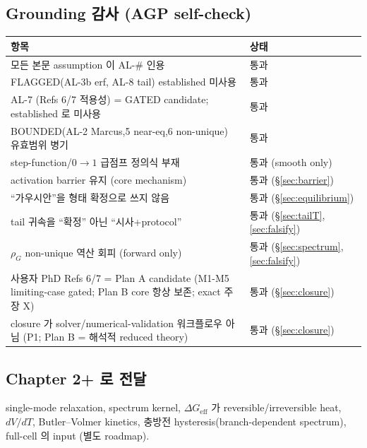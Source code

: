 \documentclass[11pt,a4paper]{article}
\newcommand{\eff}{\mathrm{eff}}
\begin{document}
\subsection{Grounding 감사 (AGP self-check)}
\begin{longtable}{p{} p{}}
\toprule 항목 & 상태 \\ \midrule \endhead
모든 본문 assumption 이 AL-\# 인용 & 통과 \\
FLAGGED(AL-3b erf, AL-8 tail) established 미사용 & 통과 \\
AL-7 (Refs 6/7 적용성) = GATED candidate; established 로 미사용 & 통과 \\
BOUNDED(AL-2 Marcus,5 near-eq,6 non-unique) 유효범위 병기 & 통과 \\
step-function/$0\!\to\!1$ 급점프 정의식 부재 & 통과 (smooth only) \\
activation barrier 유지 (core mechanism) & 통과 (\S\ref{sec:barrier}) \\
``가우시안''을 형태 확정으로 쓰지 않음 & 통과 (\S\ref{sec:equilibrium}) \\
tail 귀속을 ``확정'' 아닌 ``시사+protocol'' & 통과 (\S\ref{sec:tailT},\ref{sec:falsify}) \\
$\rho_G$ non-unique 역산 회피 (forward only) & 통과 (\S\ref{sec:spectrum},\ref{sec:falsify}) \\
사용자 PhD Refs 6/7 = Plan A candidate (M1-M5 limiting-case gated; Plan B core 항상 보존; exact 주장 X) & 통과 (\S\ref{sec:closure}) \\
closure 가 solver/numerical-validation 워크플로우 아님 (P1; Plan B = 해석적 reduced theory) & 통과 (\S\ref{sec:closure}) \\
\bottomrule
\end{longtable}

\subsection{Chapter 2+ 로 전달}
single-mode relaxation, spectrum kernel, $\Delta G_\eff$ 가 reversible/irreversible heat,
$dV/dT$, Butler--Volmer kinetics, 충방전 hysteresis(branch-dependent spectrum), full-cell
의 input (별도 roadmap).
\end{document}
